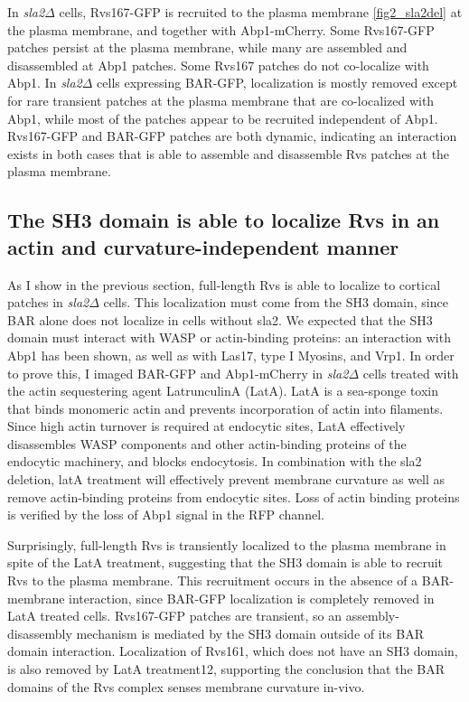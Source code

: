 	\vspace{5mm}
	In \textit{sla2$\Delta$} cells, Rvs167-GFP is recruited to the plasma membrane \ref{fig2_sla2del} at the plasma membrane, and together with Abp1-mCherry. Some Rvs167-GFP patches persist at the plasma membrane, while many are assembled and disassembled at Abp1 patches. Some Rvs167 patches do not co-localize with Abp1. In \textit{sla2$\Delta$} cells expressing BAR-GFP, localization is mostly removed except for rare transient patches at the plasma membrane that are co-localized with Abp1, while most of the patches appear to be recruited independent of Abp1. Rvs167-GFP and BAR-GFP patches are both dynamic, indicating an interaction exists in both cases that is able to assemble and disassemble Rvs patches at the plasma membrane. 

	\subsection{The SH3 domain is able to localize Rvs in an actin and curvature-independent manner}
	\label{delsh3_latA}
	As I show in the previous section, full-length Rvs is able to localize to cortical patches in \textit{sla2$\Delta$} cells. This localization must come from the SH3 domain, since BAR alone does not localize in cells without sla2. We expected that the SH3 domain must interact with WASP or actin-binding proteins: an interaction with Abp1 has been shown, as well as with Las17, type I Myosins, and Vrp1. In order to prove this, I imaged BAR-GFP and Abp1-mCherry in \textit{sla2$\Delta$} cells treated with the actin sequestering agent LatrunculinA (LatA). LatA is a sea-sponge toxin that binds monomeric actin and prevents incorporation of actin into filaments. Since high actin turnover is required at endocytic sites, LatA effectively disassembles WASP components and other actin-binding proteins of the endocytic machinery, and blocks endocytosis. In combination with the sla2 deletion, latA treatment will effectively prevent membrane curvature as well as remove actin-binding proteins from endocytic sites. Loss of actin binding proteins is verified by the loss of Abp1 signal in the RFP channel.


\newpage
Surprisingly, full-length Rvs is transiently localized to the plasma membrane in spite of the LatA treatment, suggesting that the SH3 domain is able to recruit Rvs to the plasma membrane. This recruitment occurs in the absence of a BAR-membrane interaction, since BAR-GFP localization is completely removed in LatA treated cells. Rvs167-GFP patches are transient, so an assembly-disassembly mechanism is mediated by the SH3 domain outside of its BAR domain interaction. Localization of Rvs161, which does not have an SH3 domain, is also removed by LatA treatment12, supporting the conclusion that the BAR domains of the Rvs complex senses membrane curvature in-vivo. 

